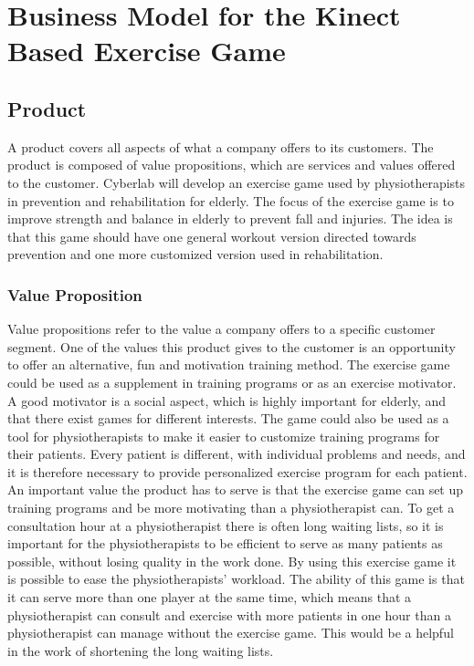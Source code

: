 \chapter{Business Model for the Kinect Based Exercise Game}
\section{Product}
A product covers all aspects of what a company offers to its customers. The product is composed of value propositions, which are services and values offered to the customer. Cyberlab will develop an exercise game used by physiotherapists in prevention and rehabilitation for elderly. The focus of the exercise game is to improve strength and balance in elderly to prevent fall and injuries. The idea is that this game should have one general workout version directed towards prevention and one more customized version used in rehabilitation.
\subsection{Value Proposition}
Value propositions refer to the value a company offers to a specific customer segment. One of the values this product gives to the customer is an opportunity to offer an alternative, fun and motivation training method. The exercise game could be used as a supplement in training programs or as an exercise motivator. A good motivator is a social aspect, which is highly important for elderly, and that there exist games for different interests. The game could also be used as a tool for physiotherapists to make it easier to customize training programs for their patients. Every patient is different, with individual problems and needs, and it is therefore necessary to provide personalized exercise program for each patient. An important value the product has to serve is that the exercise game can set up training programs and be more motivating than a physiotherapist can. To get a consultation hour at a physiotherapist there is often long waiting lists, so it is important for the physiotherapists to be efficient to serve as many patients as possible, without losing quality in the work done. By using this exercise game it is possible to ease the physiotherapists’ workload. The ability of this game is that it can serve more than one player at the same time, which means that a physiotherapist can consult and exercise with more patients in one hour than a physiotherapist can manage without the exercise game. This would be a helpful in the work of shortening the long waiting lists.
